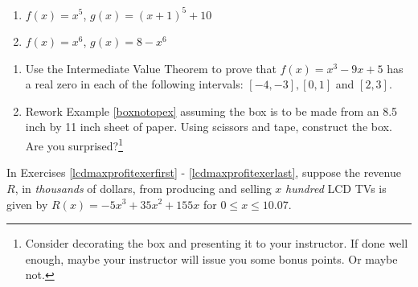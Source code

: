 \documentclass{ximera}
\begin{document}
\begin{enumerate}
\setcounter{enumi}{\value{HW}}

\item $f(x) = x^5$, $g(x) = (x+1)^5+10$
\item $f(x) = x^6$, $g(x) = 8-x^6$ \label{polytranslast}

\setcounter{HW}{\value{enumi}}
\end{enumerate}



\begin{enumerate}
\setcounter{enumi}{\value{HW}}

\item Use the Intermediate Value Theorem to prove that $f(x) = x^{3} - 9x + 5$ has a real zero in each of the following intervals: $[-4, -3], [0, 1]$ and $[2, 3]$.

\item  Rework Example \ref{boxnotopex} assuming the box is to be made from an 8.5 inch by 11 inch sheet of paper. Using scissors and tape, construct the box.  Are you surprised?\footnote{Consider decorating the box and presenting it to your instructor. If done well enough, maybe your instructor will issue you some bonus points.  Or maybe not.}

\setcounter{HW}{\value{enumi}}
\end{enumerate}


\label{LCDmaxprofit} 

In Exercises \ref{lcdmaxprofitexerfirst} - \ref{lcdmaxprofitexerlast}, suppose the revenue $R$, in \textit{thousands} of dollars, from producing and selling $x$ \textit{hundred} LCD TVs is given by $R(x) = -5x^3+35x^2+155x$ for $0 \leq x \leq 10.07$.
\end{document}
